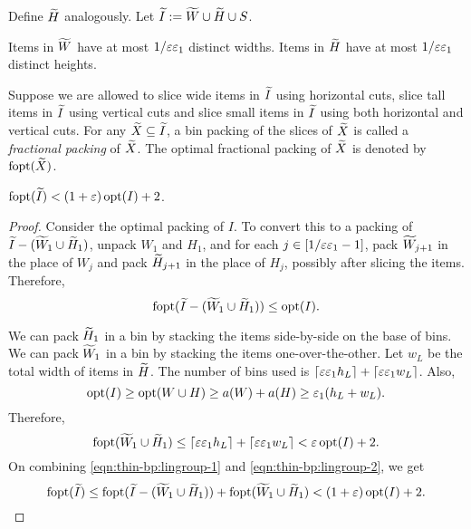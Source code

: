 Define $\widetilde{H}$ analogously. Let $\widetilde{I} := \widetilde{W} \cup \widetilde{H} \cup S$.

\begin{claim}
\label{thm:thin-bp:lingroup-distinct}
Items in $\widetilde{W}$ have at most $1/\varepsilon\varepsilon_1$ distinct widths.
Items in $\widetilde{H}$ have at most $1/\varepsilon\varepsilon_1$ distinct heights.
\end{claim}

\begin{definition}
Suppose we are allowed to slice wide items in $\widetilde{I}$ using horizontal cuts,
slice tall items in $\widetilde{I}$ using vertical cuts and slice
small items in $\widetilde{I}$ using both horizontal and vertical cuts.
For any $\widetilde{X} \subseteq \widetilde{I}$, a bin packing of the slices of $\widetilde{X}$
is called a \emph{fractional packing} of $\widetilde{X}$.
The optimal fractional packing of $\widetilde{X}$ is denoted by $\operatorname{fopt}(\widetilde{X})$.
\end{definition}

\begin{lemma}
\label{thm:thin-bp:lingroup-opt-compare}
$\operatorname{fopt}(\widetilde{I}) < (1+\varepsilon)\operatorname{opt}(I) + 2$.
\end{lemma}
\begin{proof}
Consider the optimal packing of $I$.
To convert this to a packing of $\widetilde{I} - (\widetilde{W}_1 \cup \widetilde{H}_1)$,
unpack $W_1$ and $H_1$, and for each $j \in [1/\varepsilon\varepsilon_1-1]$,
pack $\widetilde{W}_{j+1}$ in the place of $W_j$
and pack $\widetilde{H}_{j+1}$ in the place of $H_j$,
possibly after slicing the items.
Therefore,
\begin{equation}
\label{eqn:thin-bp:lingroup-1}
\operatorname{fopt}(\widetilde{I} - (\widetilde{W}_1 \cup \widetilde{H}_1)) \le \operatorname{opt}(I).
\end{equation}

We can pack $\widetilde{H}_1$ in a bin by stacking the items side-by-side on the base of bins.
We can pack $\widetilde{W}_1$ in a bin by stacking the items one-over-the-other.
Let $w_L$ be the total width of items in $\widetilde{H}$. The number of bins used is
$\lceil \varepsilon\varepsilon_1 h_L \rceil + \lceil \varepsilon\varepsilon_1 w_L \rceil$. Also,
\[ \operatorname{opt}(I) \ge \operatorname{opt}(W \cup H)
\ge a(W) + a(H) \ge \varepsilon_1(h_L + w_L). \]
Therefore,
\begin{equation}
\label{eqn:thin-bp:lingroup-2}
\operatorname{fopt}(\widetilde{W}_1 \cup \widetilde{H}_1)
\le \lceil \varepsilon\varepsilon_1 h_L \rceil + \lceil \varepsilon\varepsilon_1 w_L \rceil < \varepsilon\operatorname{opt}(I) + 2.
\end{equation}
On combining \eqref{eqn:thin-bp:lingroup-1} and \eqref{eqn:thin-bp:lingroup-2}, we get
\[ \operatorname{fopt}(\widetilde{I}) \le \operatorname{fopt}(\widetilde{I} - (\widetilde{W}_1 \cup \widetilde{H}_1))
    + \operatorname{fopt}(\widetilde{W}_1 \cup \widetilde{H}_1)
< (1+\varepsilon)\operatorname{opt}(I) + 2.
\qedhere \]
\end{proof}
